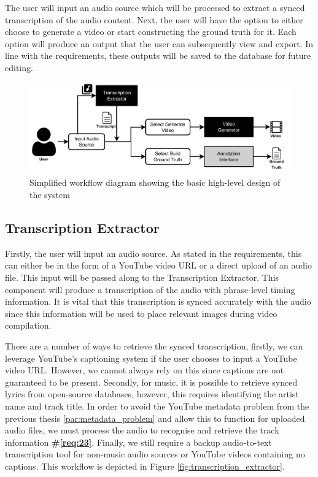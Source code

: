 \documentclass{l4proj}
\begin{document}
The user will input an audio source which will be processed to extract a synced transcription of the audio content. Next, the user will have the option to either choose to generate a video or start constructing the ground truth for it. Each option will produce an output that the user can subsequently view and export. In line with the requirements, these outputs will be saved to the database for future editing.

\begin{figure}[h]
    \centering
    \includegraphics[width=1\textwidth]{figures/simplified_architecture.pdf}
    \caption{Simplified workflow diagram showing the basic high-level design of the system}
    \label{fig:simplified_workflow}
\end{figure}

\subsection{Transcription Extractor}
Firstly, the user will input an audio source. As stated in the requirements, this can either be in the form of a YouTube video URL or a direct upload of an audio file. This input will be passed along to the Transcription Extractor. This component will produce a transcription of the audio with phrase-level timing information. It is vital that this transcription is synced accurately with the audio since this information will be used to place relevant images during video compilation.

There are a number of ways to retrieve the synced transcription, firstly, we can leverage YouTube's captioning system if the user chooses to input a YouTube video URL. However, we cannot always rely on this since captions are not guaranteed to be present. Secondly, for music, it is possible to retrieve synced lyrics from open-source databases, however, this requires identifying the artist name and track title. In order to avoid the YouTube metadata problem from the previous thesis \ref{par:metadata_problem} and allow this to function for uploaded audio files, we must process the audio to recognise and retrieve the track information \textbf{\#\ref{req:23}}. Finally, we still require a backup audio-to-text transcription tool for non-music audio sources or YouTube videos containing no captions. This workflow is depicted in Figure \ref{fig:transcription_extractor}.
\end{document}
